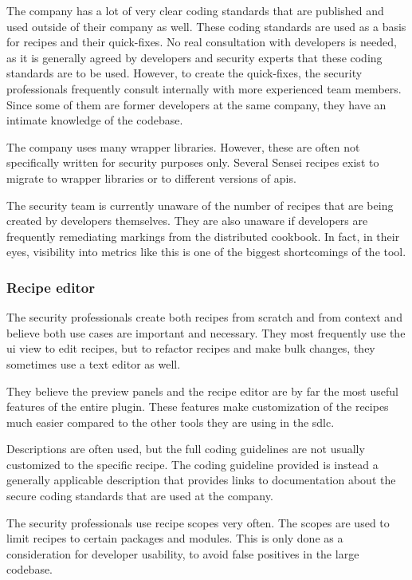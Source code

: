The company has a lot of very clear coding standards that are published and used outside of their company as well.
These coding standards are used as a basis for recipes and their quick-fixes.
No real consultation with developers is needed, as it is generally agreed by developers and security experts that these coding standards are to be used.
However, to create the quick-fixes, the security professionals frequently consult internally with more experienced team members.
Since some of them are former developers at the same company, they have an intimate knowledge of the codebase.

The company uses many wrapper libraries.
However, these are often not specifically written for security purposes only.
Several Sensei recipes exist to migrate to wrapper libraries or to different versions of \glspl{api}.

The security team is currently unaware of the number of recipes that are being created by developers themselves.
They are also unaware if developers are frequently remediating markings from the distributed cookbook.
In fact, in their eyes, visibility into metrics like this is one of the biggest shortcomings of the tool.

\subsubsection{Recipe editor}
The security professionals create both recipes from scratch and from context and believe both use cases are important and necessary.
They most frequently use the \gls{ui} view to edit recipes, but to refactor recipes and make bulk changes, they sometimes use a text editor as well.

They believe the preview panels and the recipe editor are by far the most useful features of the entire plugin.
These features make customization of the recipes much easier compared to the other tools they are using in the \gls{sdlc}.

Descriptions are often used, but the full coding guidelines are not usually customized to the specific recipe.
The coding guideline provided is instead a generally applicable description that provides links to documentation about the secure coding standards that are used at the company.

The security professionals use recipe scopes very often.
The scopes are used to limit recipes to certain packages and modules.
This is only done as a consideration for developer usability, to avoid false positives in the large codebase.

